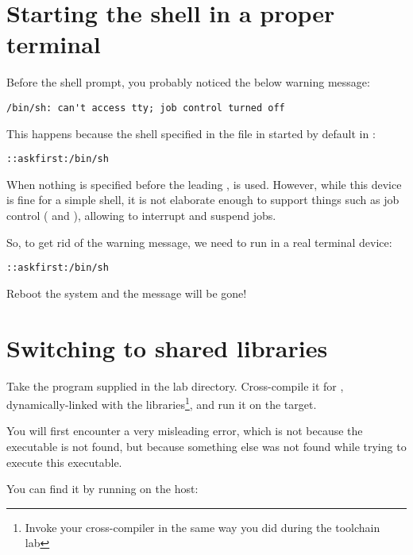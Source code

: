 \section{Starting the shell in a proper terminal}

Before the shell prompt, you probably noticed the below warning message:

\begin{verbatim}
/bin/sh: can't access tty; job control turned off
\end{verbatim}

This happens because the shell specified in the  file
in started by default in :

\begin{verbatim}
::askfirst:/bin/sh
\end{verbatim}

When nothing is specified before the leading \code{::}, 
is used. However, while this device is fine for a simple shell, it is
not elaborate enough to support things such as job control
(\code{[Ctrl][c]} and \code{[Ctrl][z]}), allowing to interrupt and
suspend jobs.

So, to get rid of the warning message, we need  to run
 in a real terminal device:

{\tt \ttyname::askfirst:/bin/sh}

Reboot the system and the message will be gone!

\section{Switching to shared libraries}

Take the  program supplied in the lab 
directory. Cross-compile it for ,
dynamically-linked with the libraries\footnote{Invoke your cross-compiler
in the same way you did during the toolchain lab}, and run it on the target.

You will first encounter a very misleading  error,
which is not because the  executable is not found, but
because something else was not found while trying to execute
this executable.

You can find it by running  on the host:


